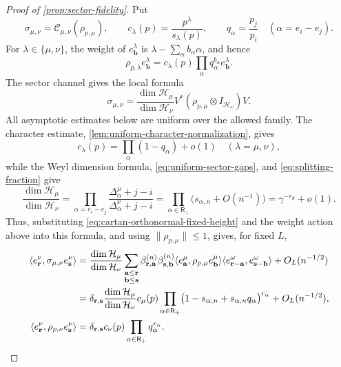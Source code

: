 \documentclass[11pt]{article}
\theoremstyle{remark}
\theoremstyle{plain}
\newcommand{\cC}{\mathcal C}
\newcommand{\cH}{\mathcal H}
\newcommand{\ot}{\otimes}
\begin{document}
\begin{proof}[Proof of \cref{prop:sector-fidelity}]
Put
\[
  \sigma_{\mu,\nu}=\cC_{\mu,\nu}(\rho_{p,\mu}),
  \qquad
  c_\lambda(p)=\frac{p^\lambda}{s_\lambda(p)},
  \qquad
  q_\alpha=\frac{p_j}{p_i}\quad(\alpha=e_i-e_j).
\]
For \(\lambda\in\{\mu,\nu\}\), the weight of
\(e_{\mathbf b}^\lambda\) is
\(\lambda-\sum_\alpha b_\alpha\alpha\), and hence
\[
  \rho_{p,\lambda}e_{\mathbf b}^\lambda
  =c_\lambda(p)\prod_\alpha q_\alpha^{b_\alpha}e_{\mathbf b}^\lambda.
\]
The sector channel gives the local formula
\[
  \sigma_{\mu,\nu}
  =\frac{\dim\cH_\mu}{\dim\cH_\nu}
   V^*(\rho_{p,\mu}\ot I_{\cH_\omega})V.
\]
All asymptotic estimates below are uniform over the allowed family.  The
character estimate, \cref{lem:uniform-character-normalization},
gives
\[
  c_\lambda(p)=\prod_\alpha(1-q_\alpha)+o(1)
  \quad(\lambda=\mu,\nu),
\]
while the Weyl dimension formula, \eqref{eq:uniform-sector-gaps}, and
\eqref{eq:splitting-fraction} give
\[
  \frac{\dim\cH_\mu}{\dim\cH_\nu}
  =\prod_{\alpha=e_i-e_j}
    \frac{\Delta_\alpha^\mu+j-i}{\Delta_\alpha^\nu+j-i}
  =\prod_{\alpha\in\mathsf R_+}
    \bigl(s_{\alpha,n}+O(n^{-1})\bigr)
  =\gamma^{-r_d}+o(1).
\]
Thus, substituting
\eqref{eq:cartan-orthonormal-fixed-height} and the weight action above into
this formula, and using
\(\|\rho_{p,\mu}\|\le1\), gives, for fixed \(L\),
\begin{align}
  \langle e_{\mathbf r}^\nu,
    \sigma_{\mu,\nu}e_{\mathbf s}^\nu\rangle
  &={}\frac{\dim\cH_\mu}{\dim\cH_\nu}
  \sum_{\substack{\mathbf a\le\mathbf r\\
                   \mathbf b\le\mathbf s}}
  \beta_{\mathbf r,\mathbf a}^{(n)}
  \beta_{\mathbf s,\mathbf b}^{(n)}
  \langle e_{\mathbf a}^\mu,
    \rho_{p,\mu}e_{\mathbf b}^\mu\rangle
  \langle e_{\mathbf r-\mathbf a}^\omega,
    e_{\mathbf s-\mathbf b}^\omega\rangle
  +O_L(n^{-1/2})\notag\\
  &={}
  \delta_{\mathbf r,\mathbf s}
  \frac{\dim\cH_\mu}{\dim\cH_\nu}c_\mu(p)
  \prod_{\alpha\in\mathsf R_+}
  \bigl(1-s_{\alpha,n}+s_{\alpha,n}q_\alpha\bigr)^{r_\alpha}
  +O_L(n^{-1/2}),
  \label{eq:sector-output-fixed-matrix}\\
  \langle e_{\mathbf r}^\nu,
    \rho_{p,\nu}e_{\mathbf s}^\nu\rangle
  &=\delta_{\mathbf r,\mathbf s}
    c_\nu(p)\prod_{\alpha\in\mathsf R_+}q_\alpha^{r_\alpha}.
  \label{eq:sector-target-fixed-matrix}
\end{align}


\end{proof}
\end{document}
